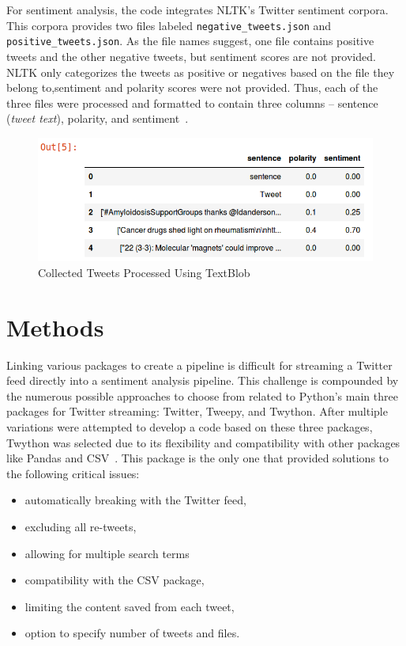 For sentiment analysis, the code integrates NLTK's Twitter sentiment
corpora.  This corpora provides two files labeled
\verb|negative_tweets.json| and \verb|positive_tweets.json|.  As the
file names suggest, one file contains positive tweets and the other
negative tweets, but sentiment scores are not provided.  NLTK only
categorizes the tweets as positive or negatives based on the file they
belong to,sentiment and polarity scores were not provided.  Thus, each
of the three files were processed and formatted to contain three
columns -- sentence (\emph{tweet text}), polarity, and
sentiment~\cite{twitter_analysis}.

\begin{figure}[H]
\centering
\includegraphics[width=\columnwidth]{images/collected_tweets_head.png}
\caption{Collected Tweets Processed Using TextBlob}
\label{fig:textblob_tweets}
\end{figure} 

\section{Methods}

Linking various packages to create a pipeline is difficult for
streaming a Twitter feed directly into a sentiment analysis pipeline.
This challenge is compounded by the numerous possible approaches to
choose from related to Python's main three packages for Twitter
streaming: Twitter, Tweepy, and Twython.  After multiple variations
were attempted to develop a code based on these three packages,
Twython was selected due to its flexibility and compatibility with
other packages like Pandas and
CSV~\cite{twitterU46,clay2013,python37,python-csv}.  This package is
the only one that provided solutions to the following critical issues:

\begin{itemize}
\item automatically breaking with the Twitter feed,
\item excluding all re-tweets,
\item allowing for multiple search terms
\item compatibility with the CSV package,
\item limiting the content saved from each tweet,
\item option to specify number of tweets and files.
\end{itemize}

